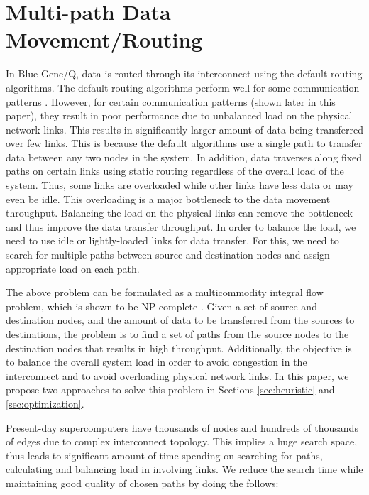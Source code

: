 \section{Multi-path Data Movement/Routing}
\label{sec:approach}


In Blue Gene/Q, data is routed through its interconnect using the default routing algorithms. The default routing algorithms perform well for some communication patterns \cite{Chen:BGQ}. However, for certain communication patterns (shown later in this paper), they result in poor performance due to unbalanced load on the physical network links. This results in significantly larger amount of data being transferred over few links. This is because the default algorithms use a single path to transfer data between any two nodes in the system. In addition, data traverses along fixed paths on certain links using static routing regardless of the overall load of the system. Thus, some links are overloaded while other links have less data or may even be idle. This overloading is a major bottleneck to the data movement throughput. Balancing the load on the physical links can remove the bottleneck and thus improve the data transfer throughput. In order to balance the load, we need to use idle or lightly-loaded links for data transfer. For this, we need to search for multiple paths between source and destination nodes and assign appropriate load on each path.

The above problem can be formulated as a multicommodity integral flow problem, which is shown to be NP-complete \cite{even1975}. Given a set of source and destination nodes, and the amount of data to be transferred from the sources to destinations, the problem is to find a set of paths from the source nodes to the destination nodes that results in high throughput. Additionally, the objective is to balance the overall system load in order to avoid congestion in the interconnect and to avoid overloading physical network links. In this paper, we propose two approaches to solve this problem in Sections \ref{sec:heuristic} and \ref{sec:optimization}.

Present-day supercomputers have thousands of nodes and hundreds of thousands of edges due to complex interconnect topology. This implies a huge search space, thus leads to significant amount of time spending on searching for paths, calculating and balancing load in involving links. We reduce the search time while maintaining good quality of chosen paths by doing the follows:

